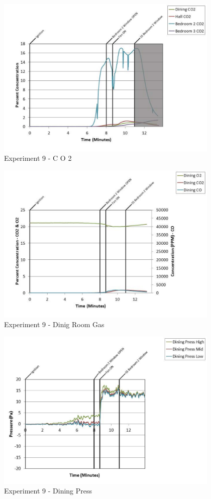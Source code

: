 \documentclass{article}
\begin{document}
\begin{appendices}
	\begin{figure}[h!]
		\centering
		\includegraphics[height=3.05in]{0_Images/Results_Charts/Exp_9_Charts/CO2.pdf}
		\caption{Experiment 9 - C O 2}
	\end{figure}
 
	\clearpage

	\begin{figure}[h!]
		\centering
		\includegraphics[height=3.05in]{0_Images/Results_Charts/Exp_9_Charts/DinigRoomGas.pdf}
		\caption{Experiment 9 - Dinig Room Gas}
	\end{figure}
 

	\begin{figure}[h!]
		\centering
		\includegraphics[height=3.05in]{0_Images/Results_Charts/Exp_9_Charts/DiningPress.pdf}
		\caption{Experiment 9 - Dining Press}
	\end{figure}
 

\end{appendices}
\end{document}

